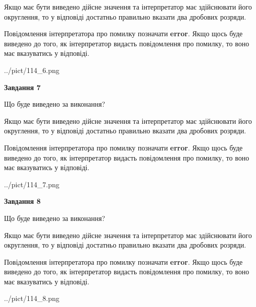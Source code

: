 \documentclass[12pt, ukrainian]{article}
\begin{document}
{\begin {Large}
Якщо має бути виведено дійсне значення та інтерпретатор має здійснювати його округлення, 
то у відповіді достатньо правильно вказати два дробових розряди.

Повідомлення інтерпретатора про помилку позначати \textbf{error}.
Якщо щось буде виведено до того, як інтерпретатор видасть повідомлення про помилку, 
то воно має вказуватись у відповіді. \par

\begin{center}
	{../pict/114_6.png}
\end{center}
\newpage

{\begin {center}\textbf{Завдання 7}\end {center}}\par
Що буде виведено за виконання? \par

Якщо має бути виведено дійсне значення та інтерпретатор має здійснювати його округлення, 
то у відповіді достатньо правильно вказати два дробових розряди.

Повідомлення інтерпретатора про помилку позначати \textbf{error}.
Якщо щось буде виведено до того, як інтерпретатор видасть повідомлення про помилку, 
то воно має вказуватись у відповіді. \par

\begin{center}
	{../pict/114_7.png}
\end{center}
\newpage

{\begin {center}\textbf{Завдання 8}\end {center}}\par
Що буде виведено за виконання? \par

Якщо має бути виведено дійсне значення та інтерпретатор має здійснювати його округлення, 
то у відповіді достатньо правильно вказати два дробових розряди.

Повідомлення інтерпретатора про помилку позначати \textbf{error}.
Якщо щось буде виведено до того, як інтерпретатор видасть повідомлення про помилку, 
то воно має вказуватись у відповіді. \par

\begin{center}
	{../pict/114_8.png}
\end{center}
\newpage


\end{Large}}
\end{document}
